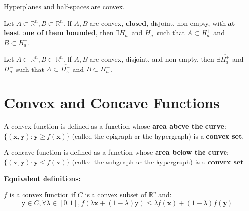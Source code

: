 \begin{remark*}
    Hyperplanes and half-spaces are convex.
\end{remark*}

\begin{theorem}
    Let \(A \subset \mathbb{R}^{n}, B \subset \mathbb{R}^{n}\). If \(A, B\) are convex, \textbf{closed}, disjoint, non-empty, with \textbf{at least one of them bounded}, then \(\exists H_{a}^{+}\) and \(H_{a}^{- }\) such that \(A \subset H_{a}^{+}\) and \(B \subset H_{a}^{- }\).
\end{theorem}


\begin{theorem}
    Let \(A \subset \mathbb{R}^{n}, B \subset \mathbb{R}^{n}\). If \(A, B\) are convex, disjoint, and non-empty, then \(\exists \overline{H_{a}^{+}}\) and \(H_{a}^{- }\) such that \(A \subset \overline{H_{a}^{+}}\) and \(B \subset \overline{H_{a}^{- }}\).
\end{theorem}

\section{Convex and Concave Functions}

\begin{definition}
    A convex function is defined as a function whose \textbf{area above the curve}: \(\{(\mathbf{x}, \mathbf{y}): \mathbf{y} \geq f(\mathbf{x})\}\) (called the epigraph or the hypergraph) is a \textbf{convex set}.
\end{definition}

\begin{definition}
    A concave function is defined as a function whose \textbf{area below the curve}: \(\{(\mathbf{x}, \mathbf{y}): \mathbf{y} \leq f(\mathbf{x})\}\) (called the subgraph or the hypergraph) is a \textbf{convex set}.
\end{definition}

\textbf{Equivalent definitions:}

\begin{definition}
    \(f\) is a convex function if \(C\) is a convex subset of \(\mathbb{R}^{n}\) and:
    \[
        \mathbf{y} \in C, \forall \lambda \in [0,1], f(\lambda \mathbf{x} + (1 - \lambda)\mathbf{y}) \leq \lambda f(\mathbf{x}) + (1 - \lambda)f(\mathbf{y})
    \]
\end{definition}

